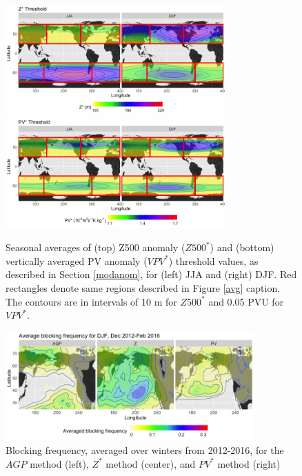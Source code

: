\documentclass[smallextended]{svjour3}       %
\numberwithin{equation}{section}
\begin{document}
\begin{figure}
\centering
\includegraphics[width=0.75\textwidth]{fig3a}
\includegraphics[width=0.75\textwidth]{fig3b}
\caption{Seasonal averages of (top) Z500 anomaly ($Z500^*$) and (bottom) vertically averaged PV anomaly ($VPV^*$) threshold values, as described in Section \ref{modanom}, for (left) JJA and (right) DJF. Red rectangles denote same regions described in Figure \ref{avg} caption. The contours are in intervals of 10 m for $Z500^*$ and 0.05 PVU for $VPV^*$.}\label{thresh}
\end{figure}




\begin{figure}
\centering
\includegraphics[width=0.85\textwidth]{fig5}
\caption{Blocking frequency, averaged over winters from 2012-2016, for the $AGP$ method (left), $Z^*$ method (center), and $PV^*$ method (right)}\label{RRRFreq}
\end{figure}
\end{document}
